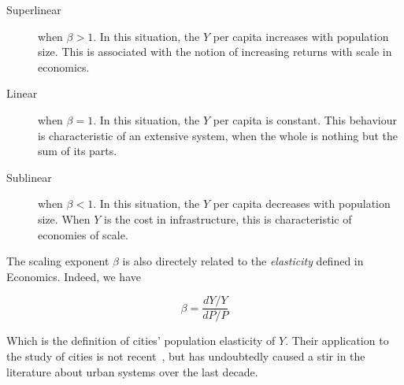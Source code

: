 \begin{description}
    \item[Superlinear] when $\beta>1$. In this situation, the $Y$ per capita
        increases with population size. This is associated with the notion of
        increasing returns with scale in economics.
    \item[Linear] when $\beta=1$. In this situation, the $Y$ per capita is
        constant. This behaviour is characteristic of an extensive system, when
        the whole is nothing but the sum of its parts.
    \item[Sublinear] when $\beta<1$. In this situation, the $Y$ per capita
        decreases with population size. When $Y$ is the cost in infrastructure,
        this is characteristic of economies of scale.
\end{description}    

The scaling exponent $\beta$ is also directely related to the \emph{elasticity}
defined in Economics. Indeed, we have

\begin{equation}
    \beta = \frac{dY/Y}{dP/P}
\end{equation}

Which is the definition of cities' population elasticity of $Y$. Their application to the study of cities
is not recent~\cite{Stewart:1947}, but has undoubtedly caused a stir in the
literature about urban systems over the last decade.\\

